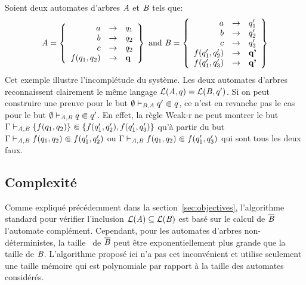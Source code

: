 \begin{example}
  Soient deux automates d'arbres $\mathit A$ et $\mathit B$ tels que:
  \[\mathit A = \left\{ 
    \begin{array}{rcl}
      a& \rightarrow &q_1\\
      b& \rightarrow &q_2\\
      c& \rightarrow &q_2\\
      f(q_1, q_2)&\rightarrow &{\textbf q}\\
    \end{array}\right\}
  \textrm { and }
  \mathit B = \left\{ 
    \begin{array}{rcl}
      a& \rightarrow &q_1'\\
      b& \rightarrow &q_2'\\
      c& \rightarrow &q_3'\\
      f(q_1', q_2')&\rightarrow &\textbf{q'}\\
      f(q_1', q_3')&\rightarrow &\textbf{q'}\\
    \end{array}\right\}
  \]
  Cet exemple illustre l'incomplétude du système. Les deux automates d'arbres reconnaissent 
  clairement le même langage $\mathcal{L}(\mathit A, q) = \mathcal{L}(\mathit B, q')$. Si on peut construire une preuve pour le but $\emptyset \vdash_{\mathit B, \mathit A} q' \Subset q$,
  ce n'est en revanche pas le cas pour le but $\emptyset \vdash_{\mathit A, \mathit B} q \Subset q'$. En effet, la règle Weak-r ne peut montrer 
  le but $\Gamma \vdash_{\mathit A, \mathit B} \{f(q_1, q_2)\} \Subset \{f(q_1', q_2'), f(q_1', q_3')\}$ qu'à partir du but $\Gamma \vdash_{\mathit A, \mathit B} f(q_1, q_2) \Subset f(q_1', q_2')$
  ou $\Gamma \vdash_{\mathit A, \mathit B} f(q_1, q_2) \Subset f(q_1', q_3')$ qui sont tous les deux faux.
\end{example}



\subsection{Complexité}
Comme expliqué précédemment dans la section~\ref{sec:objectives}, l'algorithme standard pour
vérifier l'inclusion $\mathcal{L}(\mathit A) \subseteq \mathcal{L}(\mathit B)$ est basé sur le calcul de $\overline{\mathit B}$ l'automate complément.
Cependant, pour les automates d'arbres non-déterministes, la taille~\cite{TATA} de $\overline{\mathit B}$ peut être exponentiellement plus grande
que la taille de $\mathit B$. L'algorithme proposé ici n'a pas cet inconvénient et utilise seulement
une taille mémoire qui est polynomiale par rapport à la taille des automates considérés.

